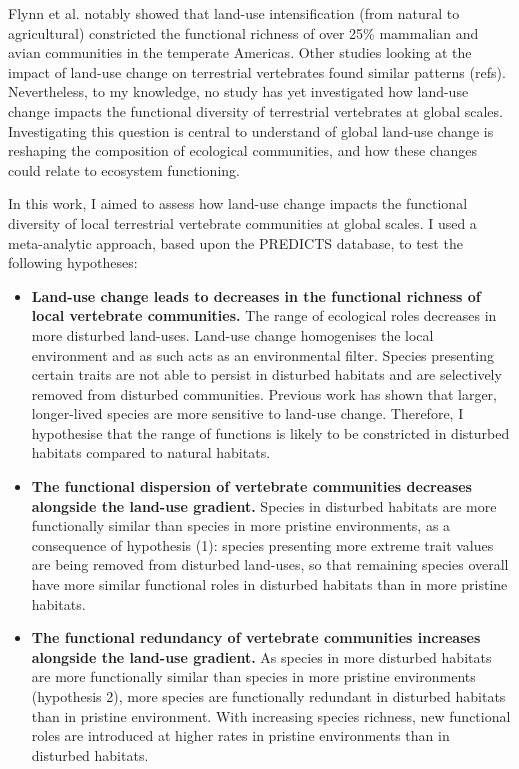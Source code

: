 Flynn et al. notably showed that land-use intensification (from natural to agricultural) constricted the functional richness of over 25\% mammalian and avian communities in the temperate Americas. Other studies looking at the impact of land-use change on terrestrial vertebrates found similar patterns (refs). Nevertheless, to my knowledge, no study has yet investigated how land-use change impacts the functional diversity of terrestrial vertebrates at global scales. Investigating this question is central to understand of global land-use change is reshaping the composition of ecological communities, and how these changes could relate to ecosystem functioning.

In this work, I aimed to assess how land-use change impacts the functional diversity of local terrestrial vertebrate communities at global scales. I used a meta-analytic approach, based upon the PREDICTS database, to test the following hypotheses:
\begin{itemize}
\item \textbf{Land-use change leads to decreases in the functional richness of local vertebrate communities.} The range of ecological roles decreases in more disturbed land-uses. Land-use change homogenises the local environment and as such acts as an environmental filter. Species presenting certain traits are not able to persist in disturbed habitats and are selectively removed from disturbed communities. Previous work has shown that larger, longer-lived species are more sensitive to land-use change. Therefore, I hypothesise that the range of functions is likely to be constricted in disturbed habitats compared to natural habitats. 
\item \textbf{The functional dispersion of vertebrate communities decreases alongside the land-use gradient.} Species in disturbed habitats are more functionally similar than species in more pristine environments, as a consequence of hypothesis (1): species presenting more extreme trait values are being removed from disturbed land-uses, so that remaining species overall have more similar functional roles in disturbed habitats than in more pristine habitats. 
\item\textbf{The functional redundancy of vertebrate communities increases alongside the land-use gradient.} As species in more disturbed habitats are more functionally similar than species in more pristine environments (hypothesis 2), more species are functionally redundant in disturbed habitats than in pristine environment. With increasing species richness, new functional roles are introduced at higher rates in pristine environments than in disturbed habitats. 
\end{itemize}




